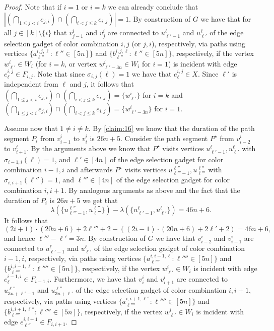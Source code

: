 \documentclass[a4paper,UKenglish,cleveref, autoref, thm-restate]{lipics-v2021}
\begin{document}
\begin{proof}
Note that if $i=1$ or $i=k$ we can already conclude that $|(\bigcap_{1\le j<i} e_{j,i}) \cap (\bigcap_{i<j\le k} e_{i,j})|=1$. 
By construction of $G$ we have that for all $j\in[k]\setminus\{i\}$ that $v^i_{j-1}$ and $v^i_j$ are connected to $u^\ell_{\ell'-1}$ and $u^\ell_{\ell'}$ of the edge selection gadget of color combination $i,j$ (or $j,i$), respectively, via paths using vertices $\{a^{i,j,\ell}_{\ell''} :  \ell''\in[5n]\}$ and $\{b^{i,j,\ell}_{\ell''} :  \ell''\in[5n]\}$, respectively, if the vertex $w^i_{\ell'}\in W_i$ (for $i=k$, or vertex $w^i_{\ell'-3n}\in W_i$ for $i=1$) is incident with edge $e^{i,j}_\ell\in F_{i,j}$. Note that since $\sigma_{i,j}(\ell)=1$ we have that $e^{i,j}_\ell\in X$.
Since $\ell'$ is independent from $\ell$ and $j$, it follows that $(\bigcap_{1\le j<i} e_{j,i}) \cap (\bigcap_{i<j\le k} e_{i,j})=\{w^i_{\ell'}\}$ for $i=k$ and $(\bigcap_{1\le j<i} e_{j,i}) \cap (\bigcap_{i<j\le k} e_{i,j})=\{w^i_{\ell'-3n}\}$ for $i=1$.

Assume now that $1\neq i\neq k$. By \cref{claim:16} we know that the duration of the path segment $P_i$ from $v^i_{i-1}$ to $v^i_i$ is $26n+5$. Consider the path segment $P^\star$ from $v^i_{i-2}$ to $v^i_{i+1}$. By the arguments above we know that $P^\star$ visits vertices $u^\ell_{\ell'-1},u^\ell_{\ell'}$ with $\sigma_{i-1,i}(\ell)=1$, and $\ell'\in[4n]$ of the edge selection gadget for color combination $i-1,i$ and afterwards $P^\star$ visits vertices $u^{\ell''}_{\ell'''-1},u^{\ell''}_{\ell'''}$ with $\sigma_{i,i+1}(\ell'')=1$, and $\ell'''\in[4n]$ of the edge selection gadget for color combination $i,i+1$.
By analogous arguments as above and the fact that the duration of $P_i$ is $26n+5$ we get that 
\[
\lambda(\{u^{\ell''}_{\ell'''-1},u^{\ell''}_{\ell'''}\})-\lambda(\{u^\ell_{\ell'-1},u^\ell_{\ell'}\}) = 46n+6.
\]
It follows that 
\[
(2i+1)\cdot (20n+6)+2\ell'''+2 -((2i-1)\cdot (20n+6)+2\ell'+2) = 46n+6,
\]
and hence $\ell'''-\ell'=3n$.
By construction of $G$ we have that $v^i_{i-2}$ and $v^i_{i-1}$ are connected to $u^\ell_{\ell'-1}$ and $u^\ell_{\ell'}$ of the edge selection gadget of color combination $i-1,i$, respectively, via paths using vertices $\{a^{i,i-1,\ell}_{\ell''''} :  \ell''''\in[5n]\}$ and $\{b^{i,i-1,\ell}_{\ell''''} :  \ell''''\in[5n]\}$, respectively, if the vertex $w^i_{\ell'}\in W_i$ is incident with edge $e^{i-1,i}_\ell\in F_{i-1,i}$. 
Furthermore, we have that $v^i_{i}$ and $v^i_{i+1}$ are connected to $u^{\ell''}_{3n+\ell'-1}$ and $u^{\ell''}_{3n+\ell'}$ of the edge selection gadget of color combination $i,i+1$, respectively, via paths using vertices $\{a^{i,i+1,\ell''}_{\ell''''} :  \ell''''\in[5n]\}$ and $\{b^{i,i+1,\ell''}_{\ell''''} :  \ell''''\in[5n]\}$, respectively, if the vertex $w^i_{\ell'}\in W_i$ is incident with edge $e^{i,i+1}_{\ell''}\in F_{i,i+1}$. 


\end{proof}
\end{document}
